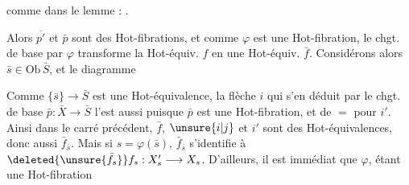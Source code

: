 
comme dans le lemme :
.

Alors $\overline{p'}$ et $\bar p$ sont des Hot-fibrations, et
comme $\varphi$ est une Hot-fibration, le chgt. de
base par $\varphi$ transforme la Hot-équiv. $f$ en
une Hot-équiv. $\bar f$. Considérons alors
$\bar s\in\mathrm{Ob}\,\bar S$, et le diagramme

Comme $\{\bar s\}\longrightarrow\bar S$ est une Hot-équivalence,
la flèche $i$ qui s'en déduit par le chgt.
de base $\bar p:\bar X\to\bar S$ l'est aussi puisque $\bar p$
est une Hot-fibration, et de $=$ pour
$i'$. Ainsi dans le carré  précédent, $\bar f$,
$\unsure{i|j}$ et $i'$ sont des Hot-équivalences, donc aussi
$\bar f_{\bar s}$. Mais  si $s=\varphi(\bar s)$, $\bar f_{\bar s}$ s'identifie
à $\deleted{\unsure{\bar f_s}}f_s:X'_s\longrightarrow X_s$. D'ailleurs, il est
immédiat que  $\varphi$, étant une Hot-fibration

